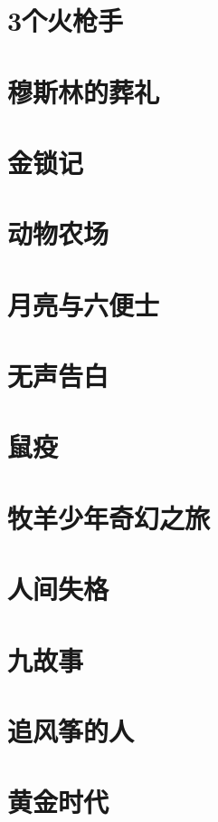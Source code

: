 \documentclass[UTF8,a4paper,12pt]{ctexbook}
\begin{document}
	\section{3个火枪手}	
	
	\section{穆斯林的葬礼}
	
	\section{金锁记}
	
	\section{动物农场}
	
	\section{月亮与六便士}
	
	\section{无声告白}
	
	\section{鼠疫}
	
	\section{牧羊少年奇幻之旅}
	
	\section{人间失格}
	
	\section{九故事}
	
	\section{追风筝的人}
	
	\section{黄金时代}
	
\end{document}
